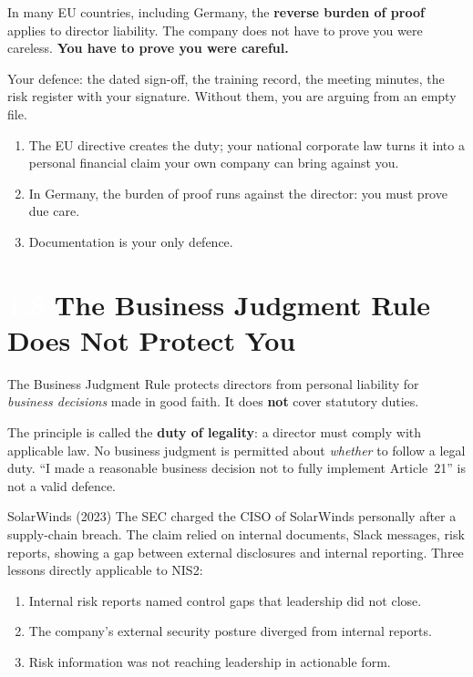 \documentclass[11pt,a4paper,twoside]{book}
\newcommand{\lessontag}[1]{%
  \texorpdfstring{%
    \setlength{\fboxsep}{3pt}\colorbox{nisd2blue}{\textcolor{white}{\footnotesize\bfseries #1}}\quad%
  }{Lesson #1\ }%
}
\begin{document}
\begin{warningbox}
In many EU countries, including Germany, the \textbf{reverse burden of proof} applies to director liability. The company does not have to prove you were careless. \textbf{You have to prove you were careful.}

Your defence: the dated sign-off, the training record, the meeting minutes, the risk register with your signature. Without them, you are arguing from an empty file.
\end{warningbox}

\begin{keytakeaways}
\begin{enumerate}
  \item The EU directive creates the duty; your national corporate law turns it into a personal financial claim your own company can bring against you.
  \item In Germany, the burden of proof runs against the director: you must prove due care.
  \item Documentation is your only defence.
\end{enumerate}
\end{keytakeaways}

\section{\lessontag{1.8}The Business Judgment Rule Does Not Protect You}

The Business Judgment Rule protects directors from personal liability for \emph{business decisions} made in good faith. It does \textbf{not} cover statutory duties.

The principle is called the \textbf{duty of legality}: a director must comply with applicable law. No business judgment is permitted about \emph{whether} to follow a legal duty. ``I made a reasonable business decision not to fully implement Article~21'' is not a valid defence.

\begin{casestudy}{SolarWinds (2023)}
The SEC charged the CISO of SolarWinds personally after a supply-chain breach. The claim relied on internal documents, Slack messages, risk reports, showing a gap between external disclosures and internal reporting. Three lessons directly applicable to NIS2:
\begin{enumerate}
  \item Internal risk reports named control gaps that leadership did not close.
  \item The company's external security posture diverged from internal reports.
  \item Risk information was not reaching leadership in actionable form.
\end{enumerate}
\end{casestudy}
\end{document}
